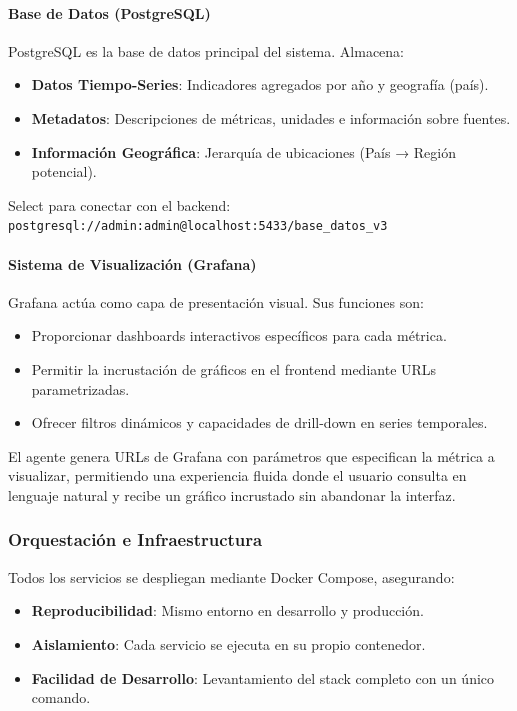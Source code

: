 \documentclass[11pt, a4paper]{report}
\begin{document}
\paragraph{Base de Datos (PostgreSQL)}

PostgreSQL es la base de datos principal del sistema. Almacena:

\begin{itemize}
    \item \textbf{Datos Tiempo-Series}: Indicadores agregados por año y geografía (país).
    \item \textbf{Metadatos}: Descripciones de métricas, unidades e información sobre fuentes.
    \item \textbf{Información Geográfica}: Jerarquía de ubicaciones (País → Región potencial).
\end{itemize}

Select para conectar con el backend: \texttt{postgresql://admin:admin@localhost:5433/base\_datos\_v3}

\paragraph{Sistema de Visualización (Grafana)}

Grafana actúa como capa de presentación visual. Sus funciones son:

\begin{itemize}
    \item Proporcionar dashboards interactivos específicos para cada métrica.
    \item Permitir la incrustación de gráficos en el frontend mediante URLs parametrizadas.
    \item Ofrecer filtros dinámicos y capacidades de drill-down en series temporales.
\end{itemize}

El agente genera URLs de Grafana con parámetros que especifican la métrica a visualizar, permitiendo una experiencia fluida donde el usuario consulta en lenguaje natural y recibe un gráfico incrustado sin abandonar la interfaz.

\subsubsection{Orquestación e Infraestructura}

Todos los servicios se despliegan mediante Docker Compose, asegurando:

\begin{itemize}
    \item \textbf{Reproducibilidad}: Mismo entorno en desarrollo y producción.
    \item \textbf{Aislamiento}: Cada servicio se ejecuta en su propio contenedor.
    \item \textbf{Facilidad de Desarrollo}: Levantamiento del stack completo con un único comando.
\end{itemize}
\end{document}

